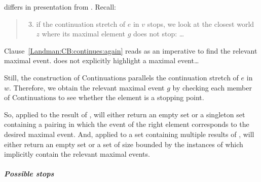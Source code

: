 \begin{note}
  \AlgGetStops{} differs in presentation from \citeauthor{Landman:1992wh}.
  Recall:
  \begin{quote}
    \begin{enumerate}
      \setcounter{enumi}{2}
    \item
      if the continuation stretch of \(e\) in \(v\) stops, we look at the closest world \(z\) where its maximal element \(g\) does not stop: \dots
    \end{enumerate}
  \end{quote}
  Clause~\ref{Landman:CB:continues:again} reads as an imperative to find the relevant maximal event.
  \AlgGetStops{} does not explicitly highlight a maximal event\dots

  Still, the construction of \(\text{Continuations}\) parallels the continuation stretch of \(e\) in \(w\).
  Therefore, we obtain the relevant maximal event \(g\) by checking each member of \(\text{Continuations}\) to see whether the element is a stopping point.

  So, applied to the result of \AlgAC{}, \AlgGetStops{} will either return an empty set or a singleton set containing a pairing in which the event of the right element corresponds to the desired maximal event.
  And, applied to a set containing multiple results of \AlgAC{}, \AlgGetStops{} will either return an empty set or a set of size bounded by the instances of \AlgAC{} which implicitly contain the relevant maximal events.
\end{note}

\subparagraph{Possible stops}

